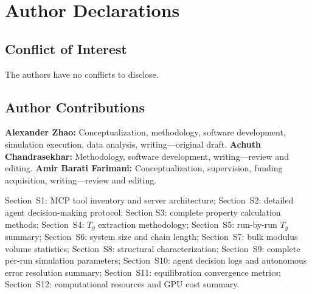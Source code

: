 \documentclass[journal=acsami,manuscript=article]{achemso}
\begin{document}
\section*{Author Declarations}

\subsection*{Conflict of Interest}
The authors have no conflicts to disclose.

\subsection*{Author Contributions}
\textbf{Alexander Zhao:} Conceptualization, methodology, software development, simulation execution, data analysis, writing---original draft.
\textbf{Achuth Chandrasekhar:} Methodology, software development, writing---review and editing.
\textbf{Amir Barati Farimani:} Conceptualization, supervision, funding acquisition, writing---review and editing.


\begin{suppinfo}
Section~S1: MCP tool inventory and server architecture;
Section~S2: detailed agent decision-making protocol;
Section S3: complete property calculation methods;
Section~S4: $T_g$ extraction methodology;
Section~S5: run-by-run $T_g$ summary;
Section~S6: system size and chain length;
Section~S7: bulk modulus volume statistics;
Section~S8: structural characterization;
Section~S9: complete per-run simulation parameters;
Section~S10: agent decision logs and autonomous error resolution summary;
Section~S11: equilibration convergence metrics;
Section~S12: computational resources and GPU cost summary.
\end{suppinfo}



\end{document}

